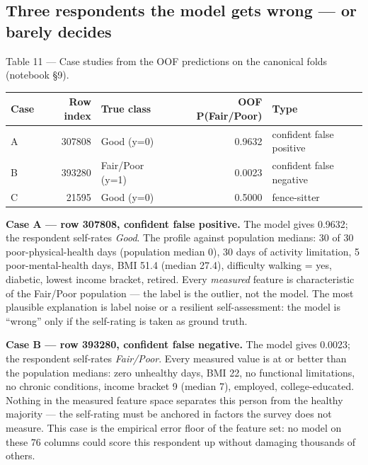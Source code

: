 \documentclass[11pt,a4paper]{article}
\begin{document}
{\subsection{Three respondents the model gets wrong --- or barely decides}\label{three-respondents-the-model-gets-wrong-or-barely-decides}

Table 11 --- Case studies from the OOF predictions on the canonical folds (notebook \S{}9).

{\def\LTcaptype{none} %

\begin{center}\small
\begin{tabular}{@{}lrlrl@{}}
\toprule\noalign{}
Case & Row index & True class & OOF P(Fair/Poor) & Type \\
\midrule\noalign{}
A & 307808 & Good (y=0) & 0.9632 & confident false positive \\
B & 393280 & Fair/Poor (y=1) & 0.0023 & confident false negative \\
C & 21595 & Good (y=0) & 0.5000 & fence-sitter \\
\bottomrule
\end{tabular}
\end{center}

}

\textbf{Case A --- row 307808, confident false positive.} The model gives 0.9632; the respondent self-rates \emph{Good}. The profile against population medians: 30 of 30 poor-physical-health days (population median 0), 30 days of activity limitation, 5 poor-mental-health days, BMI 51.4 (median 27.4), difficulty walking = yes, diabetic, lowest income bracket, retired. Every \emph{measured} feature is characteristic of the Fair/Poor population --- the label is the outlier, not the model. The most plausible explanation is label noise or a resilient self-assessment: the model is ``wrong'' only if the self-rating is taken as ground truth.

\textbf{Case B --- row 393280, confident false negative.} The model gives 0.0023; the respondent self-rates \emph{Fair/Poor}. Every measured value is at or better than the population medians: zero unhealthy days, BMI 22, no functional limitations, no chronic conditions, income bracket 9 (median 7), employed, college-educated. Nothing in the measured feature space separates this person from the healthy majority --- the self-rating must be anchored in factors the survey does not measure. This case is the empirical error floor of the feature set: no model on these 76 columns could score this respondent up without damaging thousands of others.

}
\end{document}
